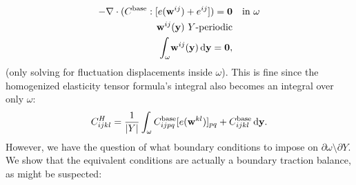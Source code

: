 \documentclass[10pt]{article}
\begin{document}
\begin{align*}
    -\nabla \cdot (C^\text{base} : [e({\bf w}^{ij}) + e^{ij}]) = {\bf 0} & \quad \text{in } \omega \\
    {\bf w}^{ij}({\bf y})\ Y \text{-periodic} & \\
    \int_\omega \! {\bf w}^{ij}({\bf y})  \, \mathrm{d} {\bf y} =  {\bf 0}, 
\end{align*}
(only solving for fluctuation displacements inside $\omega$). This is fine
since the homogenized elasticity tensor formula's integral also becomes an
integral over only $\omega$:
$$
C^H_{ijkl} = \frac{1}{|Y|} \int_\omega C_{ijpq}^\text{base} [e({\bf w}^{kl})]_{pq} + C_{ijkl}^\text{base} \, \mathrm{d} {\bf y}.
$$
However, we have the question of what boundary conditions to impose on
$\partial \omega \setminus \partial Y$. We show that the equivalent conditions
are actually a boundary traction balance, as might be suspected:
\end{document}
